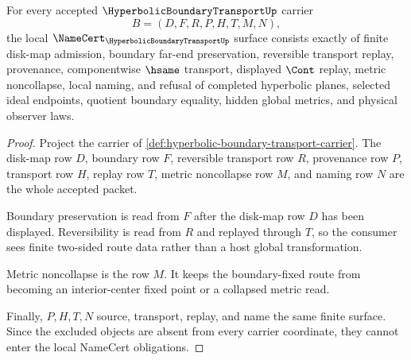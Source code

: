 \begin{theorem}
\label{thm:hyperbolic-boundary-transport-namecert-obligations}
For every accepted $\HyperbolicBoundaryTransportUp$ carrier
$$
B=(D,F,R,P,H,T,M,N),
$$
the local $\NameCert_{\HyperbolicBoundaryTransportUp}$ surface consists exactly of finite disk-map admission, boundary far-end preservation, reversible transport replay, provenance, componentwise $\hsame$ transport, displayed $\Cont$ replay, metric noncollapse, local naming, and refusal of completed hyperbolic planes, selected ideal endpoints, quotient boundary equality, hidden global metrics, and physical observer laws.
\end{theorem}
\begin{proof}
Project the carrier of \autoref{def:hyperbolic-boundary-transport-carrier}. The disk-map row $D$, boundary row $F$, reversible transport row $R$, provenance row $P$, transport row $H$, replay row $T$, metric noncollapse row $M$, and naming row $N$ are the whole accepted packet.

Boundary preservation is read from $F$ after the disk-map row $D$ has been displayed. Reversibility is read from $R$ and replayed through $T$, so the consumer sees finite two-sided route data rather than a host global transformation.

Metric noncollapse is the row $M$. It keeps the boundary-fixed route from becoming an interior-center fixed point or a collapsed metric read.

Finally, $P,H,T,N$ source, transport, replay, and name the same finite surface. Since the excluded objects are absent from every carrier coordinate, they cannot enter the local NameCert obligations.
\end{proof}



